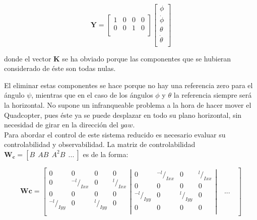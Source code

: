 \documentclass[twoside]{article}
\begin{document}
\begin{equation}
\nonumber
\pmb{Y}=\left[ \begin{array}{cccccc}
1 & 0 & 0 & 0 \\
0 & 0 & 1 & 0 \\ \end{array} \right] \left[ \begin{array}{c}
\phi \\
\dot{\phi} \\
\theta \\
\dot{\theta} \\ \end{array} \right]
\end{equation} 

donde el vector $\pmb{K}$ se ha obviado porque las componentes que se hubieran considerado de éste son todas nulas. 

El eliminar estas componentes se hace porque no hay una referencia zero para el ángulo $\psi$, mientras que en el caso de los ángulos $\phi$ y $\theta$ la referencia siempre será la horizontal. No supone un infranqueable problema a la hora de hacer mover el Quadcopter, pues éste ya se puede desplazar en todo su plano horizontal, sin necesidad de girar en la dirección del $yaw$.\\

Para abordar el control de este sistema reducido es necesario evaluar su controlabilidad y observabilidad. La matriz de controlabilidad $\pmb{W_c}=[B \>\> AB \>\> A^{2}B \>\> ... \>]$ es de la forma:

\begin{equation}
\pmb{Wc}=\left[ \left.{\begin{array}{cccc}
0 & 0 & 0 & 0 \\
0 & {}^{-l}/_{Ixx} & 0 & {}^{l}/_{Ixx} \\ 
0 & 0 & 0 & 0 \\
{}^{-l}/_{Iyy} & 0 & {}^{l}/_{Iyy} & 0 \\ \end{array}}\right\vert_{} \left.{\begin{array}{cccc}
0 & {}^{-l}/_{Ixx} & 0 & {}^{l}/_{Ixx} \\
0 & 0 & 0 & 0 \\
{}^{-l}/_{Iyy} & 0 & {}^{l}/_{Iyy} & 0 \\
0 & 0 & 0 & 0 \\
\end{array}}\right\vert_{} \quad ... \quad \right]
\end{equation}
\end{document}
